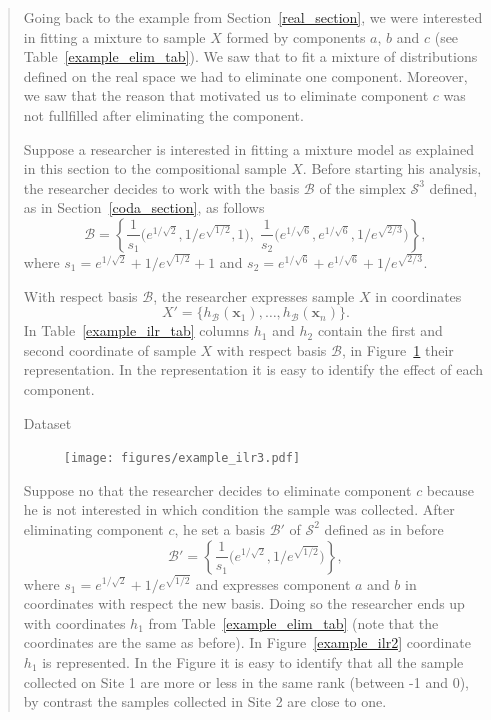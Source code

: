 \documentclass[10pt, a4paper]{article}
\begin{document}
\begin{quote}

Going back to the example from Section~\ref{real_section}, we were interested in fitting a mixture to sample $X$ formed by components $a$, $b$ and $c$ (see Table~\ref{example_elim_tab}). We saw that to fit a mixture of distributions defined on the real space we had to eliminate one component. Moreover, we saw that the reason that motivated us to eliminate component $c$ was not fullfilled after eliminating the component.

Suppose a researcher is interested in fitting a mixture model  as explained in this section to the compositional sample $X$. Before starting his analysis, the researcher decides to work with the basis $\mathcal{B}$ of the simplex $\mathcal{S}^3$ defined, as in Section~\ref{coda_section}, as follows
\begin{equation}
\mathcal{B} = \left\{ \frac{1}{s_1}\Big( e^{1/\sqrt{2}}, 1/e^{\sqrt{1/2}}, 1 \Big), \; \frac{1}{s_2}\Big( e^{1/\sqrt{6}}, e^{1/\sqrt{6}}, 1/e^{\sqrt{2/3}} \Big) \right\},
\end{equation}
where $s_1 = e^{1/\sqrt{2}} + 1/e^{\sqrt{ 1/2}} + 1$ and $s_2= e^{1/\sqrt{6}} + e^{1/\sqrt{6}} + 1/e^{\sqrt{2/3}}$. 

With respect basis $\mathcal{B}$, the researcher expresses sample $X$ in coordinates 
\[X' = \{h_{\mathcal{B}}(\textbf{x}_1), \dots, h_{\mathcal{B}}(\textbf{x}_n)\}.\] In Table~\ref{example_ilr_tab} columns $h_1$ and $h_2$ contain the first and second coordinate of sample $X$ with respect basis $\mathcal{B}$, in Figure~\ref{example_ilr3} their representation. In the representation it is easy to identify the effect of each component.

\begin{table}
\centering
\scriptsize

\caption{Dataset}
\label{example_ilr_tab}
\end{table}

\begin{figure}[thbp]
\centering
\texttt{[image: figures/example\_ilr3.pdf]}
\caption{}\label{example_ilr3}
\end{figure}

Suppose no that the researcher decides to eliminate component $c$ because he is not interested in which condition the sample was collected. After eliminating component $c$, he set a basis $\mathcal{B}'$ of $\mathcal{S}^2$ defined as in before
\begin{equation}
\mathcal{B}' = \left\{ \frac{1}{s_1}\Big( e^{1/\sqrt{2}}, 1/e^{\sqrt{1/2}} \Big) \right\},
\end{equation}
where $s_1 = e^{1/\sqrt{2}} + 1/e^{\sqrt{ 1/2}}$ and expresses component $a$ and $b$ in coordinates with respect the new basis. Doing so the researcher ends up with coordinates $h_1$ from Table~\ref{example_elim_tab} (note that the coordinates are the same as before). In Figure~\ref{example_ilr2} coordinate $h_1$ is represented. In the Figure it is easy to identify that all the sample collected on Site 1 are more or less in the same rank (between -1 and 0), by contrast the samples collected in Site 2 are close to one.



\end{quote}
\end{document}
